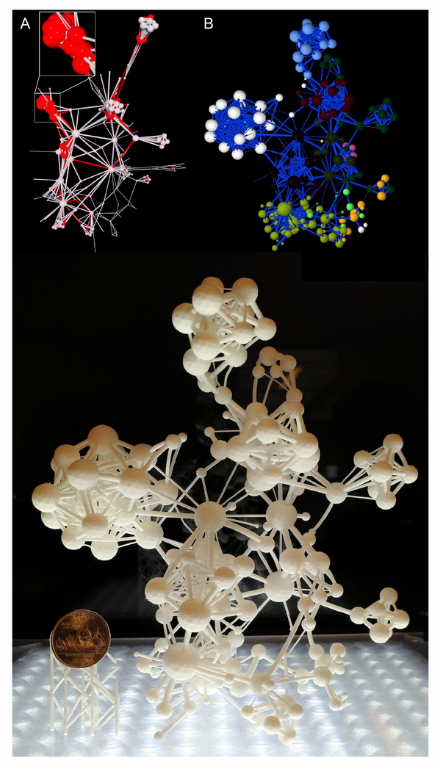 \documentclass[endfloats,nofootinbib,preprint,floatfix,titlepage,superscriptaddress,linenumbers]{revtex4-1} %
\begin{document}
{\begin{figure}
    \includegraphics[height=\textheight]{fig-09-19/3D-flavor-111917-3-2.pdf}
\end{figure}
}
\end{document}
